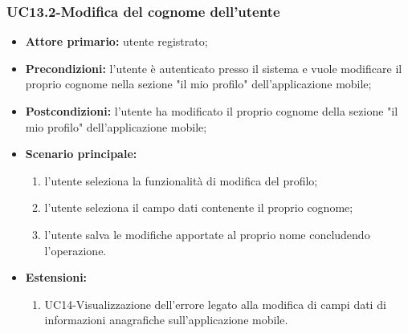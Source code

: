 \subsubsection{UC13.2-Modifica del cognome dell'utente}
\begin{itemize}
	\item \textbf{Attore primario:} utente registrato;

	\item \textbf{Precondizioni:} l'utente è autenticato presso il sistema e vuole modificare il proprio cognome nella sezione "il mio profilo" dell'applicazione mobile;

	\item \textbf{Postcondizioni:} l'utente ha modificato il proprio cognome della sezione "il mio profilo" dell'applicazione mobile;

	\item \textbf{Scenario principale:}
	
		\begin{enumerate}
    		\item l'utente seleziona la funzionalità di modifica del profilo;
    		\item l'utente seleziona il campo dati contenente il proprio cognome;
    		\item l'utente salva le modifiche apportate al proprio nome concludendo l'operazione.
		\end{enumerate}
		
	\item \textbf{Estensioni:} 
	\begin{enumerate}
    	\item UC14-Visualizzazione dell'errore legato alla modifica di campi dati di informazioni anagrafiche sull'applicazione mobile.
	\end{enumerate}
\end{itemize}


